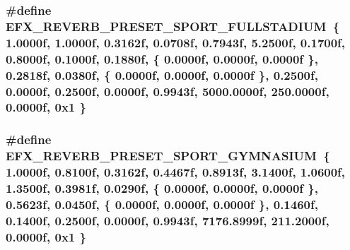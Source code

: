 \subsubsection[{\texorpdfstring{E\+F\+X\+\_\+\+R\+E\+V\+E\+R\+B\+\_\+\+P\+R\+E\+S\+E\+T\+\_\+\+S\+P\+O\+R\+T\+\_\+\+F\+U\+L\+L\+S\+T\+A\+D\+I\+UM}{EFX_REVERB_PRESET_SPORT_FULLSTADIUM}}]{\setlength{\rightskip}{0pt plus 5cm}\#define E\+F\+X\+\_\+\+R\+E\+V\+E\+R\+B\+\_\+\+P\+R\+E\+S\+E\+T\+\_\+\+S\+P\+O\+R\+T\+\_\+\+F\+U\+L\+L\+S\+T\+A\+D\+I\+UM~\{ 1.\+0000f, 1.\+0000f, 0.\+3162f, 0.\+0708f, 0.\+7943f, 5.\+2500f, 0.\+1700f, 0.\+8000f, 0.\+1000f, 0.\+1880f, \{ 0.\+0000f, 0.\+0000f, 0.\+0000f \}, 0.\+2818f, 0.\+0380f, \{ 0.\+0000f, 0.\+0000f, 0.\+0000f \}, 0.\+2500f, 0.\+0000f, 0.\+2500f, 0.\+0000f, 0.\+9943f, 5000.\+0000f, 250.\+0000f, 0.\+0000f, 0x1 \}}\hypertarget{efx-presets_8h_af8fa941595873499927d9a0c8870a20e}{}\label{efx-presets_8h_af8fa941595873499927d9a0c8870a20e}
\subsubsection[{\texorpdfstring{E\+F\+X\+\_\+\+R\+E\+V\+E\+R\+B\+\_\+\+P\+R\+E\+S\+E\+T\+\_\+\+S\+P\+O\+R\+T\+\_\+\+G\+Y\+M\+N\+A\+S\+I\+UM}{EFX_REVERB_PRESET_SPORT_GYMNASIUM}}]{\setlength{\rightskip}{0pt plus 5cm}\#define E\+F\+X\+\_\+\+R\+E\+V\+E\+R\+B\+\_\+\+P\+R\+E\+S\+E\+T\+\_\+\+S\+P\+O\+R\+T\+\_\+\+G\+Y\+M\+N\+A\+S\+I\+UM~\{ 1.\+0000f, 0.\+8100f, 0.\+3162f, 0.\+4467f, 0.\+8913f, 3.\+1400f, 1.\+0600f, 1.\+3500f, 0.\+3981f, 0.\+0290f, \{ 0.\+0000f, 0.\+0000f, 0.\+0000f \}, 0.\+5623f, 0.\+0450f, \{ 0.\+0000f, 0.\+0000f, 0.\+0000f \}, 0.\+1460f, 0.\+1400f, 0.\+2500f, 0.\+0000f, 0.\+9943f, 7176.\+8999f, 211.\+2000f, 0.\+0000f, 0x1 \}}\hypertarget{efx-presets_8h_a769afdf3f0cf5ddf3b44b336c6940950}{}\label{efx-presets_8h_a769afdf3f0cf5ddf3b44b336c6940950}
